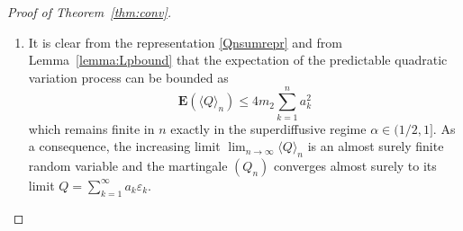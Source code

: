 \documentclass[12pt,a4paper]{article}
\newcommand{\E}{\mathbf E}
\numberwithin{equation}{section}
\begin{document}
\begin{proof}[Proof of Theorem~\ref{thm:conv}]
\begin{enumerate}
\item
It is clear from the representation \eqref{Qnsumrepr} and from Lemma~\ref{lemma:Lpbound}
that the expectation of the predictable quadratic variation process can be bounded as
\begin{equation}
\E(\langle Q\rangle_n)\le4m_2\sum_{k=1}^na_k^2
\end{equation}
which remains finite in $n$ exactly in the superdiffusive regime $\alpha\in(1/2,1]$.
As a consequence, the increasing limit $\lim_{n\to\infty}\langle Q\rangle_n$ is an almost surely finite random variable
and the martingale $(Q_n)$ converges almost surely to its limit $Q=\sum_{k=1}^\infty a_k\varepsilon_k$.


\end{enumerate}
\end{proof}
\end{document}
